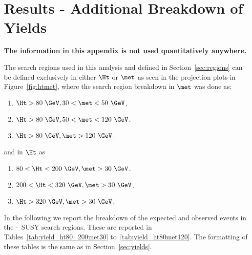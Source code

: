 \section{Results - Additional Breakdown of Yields}
\label{sec:yields_projection}


{\bf The information in this appendix is not used quantitatively anywhere.}

The search regions used in this analysis and defined in Section~\ref{sec:regions} can be defined exclusively in either $\Ht$ or $\met$ as seen in the projection plots in Figure~\ref{fig:htmet}, where the search region breakdown in $\met$ was done as:

\begin{enumerate}
	\item $\Ht > 80~\GeV, 30 < \met < 50~\GeV$.
	\item $\Ht > 80~\GeV, 50 < \met < 120~\GeV$.	
	\item $\Ht > 80~\GeV, \met > 120~\GeV$.
\end{enumerate}	
	
and in $\Ht$ as
	
\begin{enumerate}
	\item $80 < \Ht < 200~\GeV, \met > 30~\GeV$.
	\item $200 < \Ht < 320~\GeV, \met > 30~\GeV$.
	\item $\Ht > 320~\GeV, \met > 30~\GeV$.
\end{enumerate}

In the following we report the breakdown of the expected and observed events
in the \Ht-\met\ SUSY search regions.
These are reported in Tables~\ref{tab:yield_ht80_200met30} to~\ref{tab:yield_ht80met120}.
The formatting of these tables is the same as in Section~\ref{sec:yields}.

\begin{table}[h]
\begin{center}

\end{center}
\caption{\label{tab:yield_ht80_200met30}Observed event yields for 80 $< H_T < $ 200 GeV and \met $>$ 30 GeV
compared to expectations from simulation alone, and from the data-driven methods.
The {\em simulated backgrounds} contribution includes contributions from genuine  same-sign lepton
pairs (WZ, ZZ, leptons from same-sign W from single-parton, double-parton, and $t\bar{t}W$ production, etc.), 
as well as electrons from converted photons in $V\gamma$ production.
Entries with zero contributing events are reported with an uncertainty corresponding to one event.
This uncertainty is not added to the total MC contribution.
Systematic uncertainties (the second uncertainty if present)
 are displayed only for the final combined type of background, no systematic
uncertainty is added for estimates with zero entries.
Systematic uncertainties are 100\% correlated among the channels.
}
\end{table}

